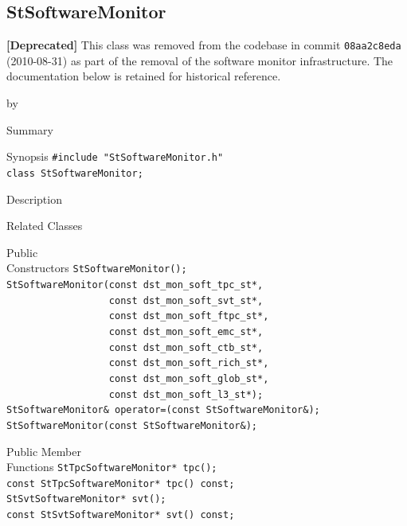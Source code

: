 \documentclass[twoside]{article}
\newcommand{\entrylabel}[1]{\mbox{\textbf{{#1}}}\hfil}%
\newenvironment{entry}
{\begin{list}{}%
    {\renewcommand{\makelabel}{\entrylabel}%
     \setlength{\labelwidth}{90pt}%
     \setlength{\leftmargin}{\labelwidth}
     \advance\leftmargin by \labelsep%
      }%
    }%
  {\end{list}}
\newcommand{\Entrylabel}[1]%
{\raisebox{0pt}[1ex][0pt]{\makebox[\labelwidth][l]%
    {\parbox[t]{\labelwidth}{\hspace{0pt}\textbf{{#1}}}}}}
\newenvironment{Entry}%
{\renewcommand{\entrylabel}{\Entrylabel}\begin{entry}}%
  {\end{entry}}
\begin{document}
\subsection{StSoftwareMonitor}
\label{sec:StSoftwareMonitor}
\textbf{[Deprecated]} This class was removed from the codebase in commit
\texttt{08aa2c8eda} (2010-08-31) as part of the removal of the software monitor
infrastructure.
The documentation below is retained for historical reference.

\begin{Entry}
\item[Summary]
\item[Synopsis]
    \verb+#include "StSoftwareMonitor.h"+\\
    \verb+class StSoftwareMonitor;+\\
\item[Description]
\item[Related Classes]
\item[Public\\ Constructors]
    \verb+StSoftwareMonitor();+\\
    \verb+StSoftwareMonitor(const dst_mon_soft_tpc_st*,+\\
    \verb+                  const dst_mon_soft_svt_st*,+\\
    \verb+                  const dst_mon_soft_ftpc_st*,+\\
    \verb+                  const dst_mon_soft_emc_st*,+\\
    \verb+                  const dst_mon_soft_ctb_st*,+\\
    \verb+                  const dst_mon_soft_rich_st*,+\\
    \verb+                  const dst_mon_soft_glob_st*,+\\
    \verb+                  const dst_mon_soft_l3_st*);+\\
    \verb+StSoftwareMonitor& operator=(const StSoftwareMonitor&);+\\
    \verb+StSoftwareMonitor(const StSoftwareMonitor&);+\\
\item[Public Member\\ Functions]
    \verb+StTpcSoftwareMonitor* tpc();+\\
    \verb+const StTpcSoftwareMonitor* tpc() const;+\\
    \verb+StSvtSoftwareMonitor* svt();+\\
    \verb+const StSvtSoftwareMonitor* svt() const;+\\

\end{Entry}
\end{document}
